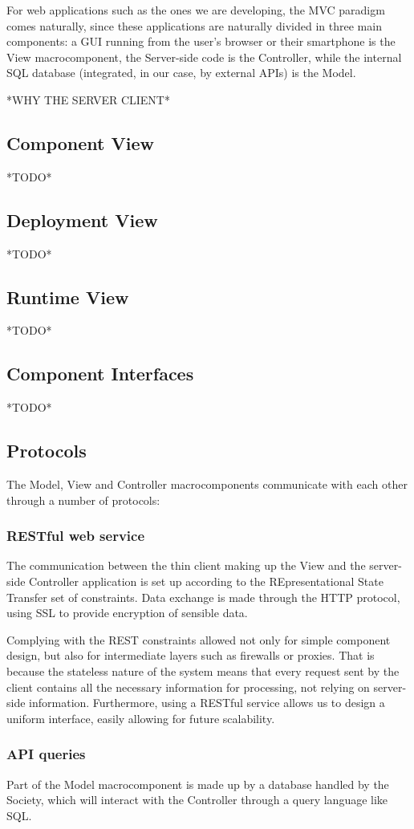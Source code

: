\documentclass[12pt]{article}
\begin{document}
For web applications such as the ones we are developing, the MVC paradigm comes naturally, since these applications are naturally divided in three main components: a GUI running from the user's browser or their smartphone is the View macrocomponent, the Server-side code is the Controller, while the internal SQL database (integrated, in our case, by external APIs) is the Model.

*WHY THE SERVER CLIENT*

\subsection{Component View}
*TODO*
\subsection{Deployment View}
*TODO*
\subsection{Runtime View}
*TODO*
\subsection{Component Interfaces}
*TODO*
\subsection{Protocols}
The Model, View and Controller macrocomponents communicate with each other through a number of protocols:
\subsubsection{RESTful web service}
The communication between the thin client making up the View and the server-side Controller application is set up according to the REpresentational State Transfer set of constraints. Data exchange is made through the HTTP protocol, using SSL to provide encryption of sensible data.

Complying with the REST constraints allowed not only for simple component design, but also for intermediate layers such as firewalls or proxies. That is because the stateless nature of the system means that every request sent by the client contains all the necessary information for processing, not relying on server-side information. Furthermore, using a RESTful service allows us to design a uniform interface, easily allowing for future scalability.
\subsubsection{API queries}
Part of the Model macrocomponent is made up by a database handled by the Society, which will interact with the Controller through a query language like SQL.
\end{document}
